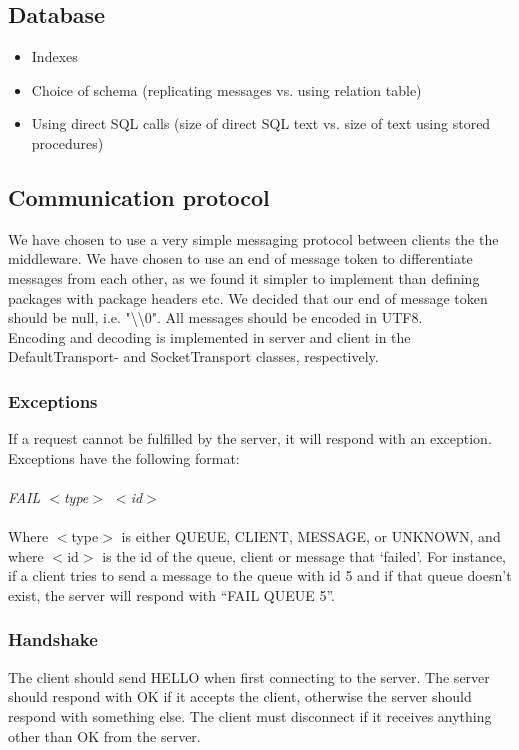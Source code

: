\documentclass{article}
\begin{document}
        \subsection{Database}
            \begin{itemize}
                \item Indexes
                \item Choice of schema (replicating messages vs. using relation table)
                \item Using direct SQL calls (size of direct SQL text vs. size of text using stored procedures)
            \end{itemize}

        \subsection{Communication protocol}
            We have chosen to use a very simple messaging protocol between clients the the middleware. We have chosen to use an end of message token to differentiate messages from each other, as we found it simpler to implement than defining packages with package headers etc. We decided that our end of message token should be null, i.e. "\textbackslash\textbackslash0". All messages should be encoded in UTF8.\\
            Encoding and decoding is implemented in server and client in the DefaultTransport- and SocketTransport classes, respectively.


            \subsubsection{Exceptions}
                If a request cannot be fulfilled by the server, it will respond with an exception.  Exceptions have the following format:\\
                \\
                \indent\textit{FAIL $<$type$>$ $<$id$>$}\\
                \\
                Where $<$type$>$ is either QUEUE, CLIENT, MESSAGE, or UNKNOWN, and where $<$id$>$ is the id of the queue, client or message that ‘failed’. For instance, if a client tries to send a message to the queue with id 5 and if that queue doesn’t exist, the server will respond with “FAIL QUEUE 5”.

            \subsubsection{Handshake}
                The client should send HELLO when first connecting to the server. The server should respond with OK if it accepts the client, otherwise the server should respond with something else. The client must disconnect if it receives anything other than OK from the server.
\end{document}
